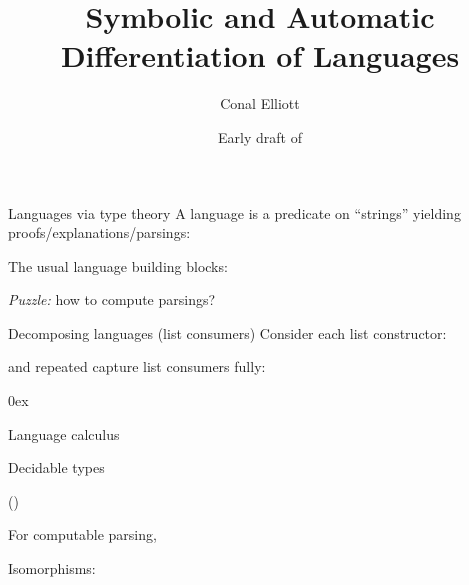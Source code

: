 \documentclass[aspectratio=169]{beamer}
\title{Symbolic and Automatic Differentiation of Languages}
\author{Conal Elliott}
\date{Early draft of \DTMnow}
\begin{document}
\begin{center}
\maketitle
{}
\end{center}

\rnc{}

\begin{frame}{Languages via type theory}
\vspace{1.5ex}
A language is a predicate on ``strings'' yielding proofs/explanations/parsings:
\vspace{1ex}

The usual language building blocks:
\vspace{-2ex}


\vspace{-1ex}
\emph{Puzzle:} how to compute parsings?
\end{frame}

\rnc{}

\begin{frame}{Decomposing languages (list consumers)}
\vspace{2ex}
Consider each list constructor:
\vspace{1.5ex}

\vspace{2ex}
 and repeated  capture list consumers fully:

\vspace{-1ex}
\begin{minipage}[c]{2.8in}
\end{minipage}
\hfill
\begin{minipage}[c]{2.5in}
\mathindent0ex
\end{minipage}
\hfill\;
\end{frame}

\begin{frame}{Language calculus}
\vspace{-1ex}
\vfill
{}
\end{frame}

\rnc{}

\begin{frame}{Decidable types}
\begin{minipage}{2in}
\end{minipage}
\hfill
\begin{minipage}{2in}
\vspace{6.3ex}
()
\end{minipage}
\hfill\;

For computable parsing,

Isomorphisms:

\end{frame}
\end{document}

